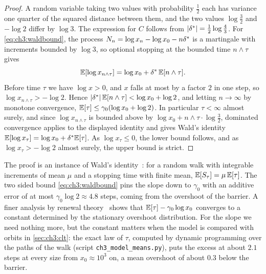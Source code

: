 \begin{proof}
A random variable taking two values with probability $\tfrac12$ each has
variance one quarter of the squared distance between them, and the two values
$\log\frac32$ and $-\log2$ differ by $\log3$. The expression for $C$ follows
from $|\delta^{*}|=\tfrac12\log\tfrac43$. For \eqref{eq:ch3:waldbound}, the process
$N_n=\log x_n-\log x_0-n\delta^{*}$ is a martingale with increments bounded by $\log 3$,
so optional stopping at the bounded time $n\wedge\tau$ gives
\[
  \mathbb{E}[\log x_{n\wedge\tau}]=\log x_0+\delta^{*}\,\mathbb{E}[n\wedge\tau].
\]
Before time $\tau$ we have $\log x>0$, and $x$ falls at most by a factor $2$ in
one step, so $\log x_{n\wedge\tau}>-\log 2$. Hence
$|\delta^{*}|\,\mathbb{E}[n\wedge\tau]<\log x_0+\log2$, and letting $n\to\infty$ by monotone
convergence, $\mathbb{E}[\tau]\le\gamma_0(\log x_0+\log 2)$. In particular $\tau<\infty$
almost surely, and since $\log x_{n\wedge\tau}$ is bounded above by
$\log x_0+n\wedge\tau\cdot\log\frac32$, dominated convergence applies to the
displayed identity and gives Wald's identity
$\mathbb{E}[\log x_\tau]=\log x_0+\delta^{*}\mathbb{E}[\tau]$. As $\log x_\tau\le0$, the lower bound
follows, and as $\log x_\tau>-\log2$ almost surely, the upper bound is strict.
\end{proof}

The proof is an instance of Wald's identity~\cite{wald1944}: for a random walk
with integrable increments of mean $\mu$ and a stopping time with finite mean,
$\mathbb{E}[S_\tau]=\mu\,\mathbb{E}[\tau]$. The two sided bound \eqref{eq:ch3:waldbound} pins
the slope down to $\gamma_0$ with an additive error of at most
$\gamma_0\log2\approx4.8$ steps, coming from the overshoot of the barrier. A
finer analysis by renewal theory~\cite{feller1971,gut1988} shows that
$\mathbb{E}[\tau]-\gamma_0\log x_0$ converges to a constant determined by the
stationary overshoot distribution.
For the slope we need nothing more, but the constant matters when the model is compared with orbits in \cref{sec:ch3:clt}: the exact law of $\tau$, computed by dynamic programming over the paths of the walk (script \texttt{ch3\_model\_means.py}), puts the excess at about $2.1$ steps at every size from $x_0\approx10^3$ on, a mean overshoot of about $0.3$ below the barrier.

